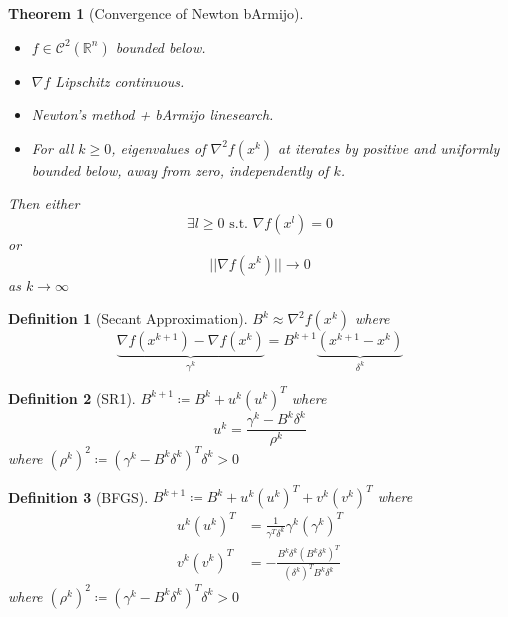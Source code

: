 \documentclass[a4paper]{article}
\newcommand{\R}{\mathbb{R}}
\newcommand{\C}{\mathcal{C}}
\newcommand{\st}{\text{ s.t. }}
\newcommand{\norm}[1]{\lvert \lvert #1 \rvert \rvert}
\newtheorem{theorem}{Theorem}
\newtheorem*{definition*}{Definition}
\begin{document}
\setcounter{theorem}{8}
\begin{theorem}[Convergence of Newton bArmijo]
    \begin{itemize}
        \item $f \in \C^2 \left( \R^n \right)$ bounded below.
        \item $\nabla f$ Lipschitz continuous.
        \item Newton's method + bArmijo linesearch.
        \item For all $k \geq 0$, eigenvalues of $\nabla^2 f\left( x^k \right)$ at iterates by positive and uniformly bounded below, away from zero, independently of $k$.
    \end{itemize}
    Then either
    \begin{equation*}
        \exists l \geq 0 \st \nabla f \left( x^l \right) = 0
    \end{equation*}
    or
    \begin{equation*}
        \norm{\nabla f \left( x^k \right)} \rightarrow 0
    \end{equation*}
    as $k \rightarrow \infty$
\end{theorem}

\begin{definition*}[Secant Approximation]
    $B^k \approx \nabla^2 f \left( x^k \right)$ where
    \begin{equation*}
        \underbrace{\nabla f \left( x^{k+1} \right) - \nabla f \left( x^k \right)}_{\gamma^k} = B^{k+1} \underbrace{\left( x^{k+1} - x^k \right)}_{\delta^k}
    \end{equation*}
\end{definition*}

\begin{definition*}[SR1]
    $B^{k+1} \coloneqq B^k + u^k \left( u^k \right)^T$ where
    \begin{equation*}
        u^k = \frac{\gamma^k - B^k \delta^k}{\rho^k}
    \end{equation*}
    where $\left( \rho^k \right)^2 \coloneqq \left( \gamma^k - B^k \delta^k \right)^T \delta^k > 0$
\end{definition*}

\begin{definition*}[BFGS]
    $B^{k+1} \coloneqq B^k + u^k \left( u^k \right)^T + v^k \left( v^k \right)^T$ where
    \begin{align*}
        u^k \left( u^k \right)^T &=  \frac{1}{\gamma^T \delta^k}\gamma^k \left( \gamma^k \right)^T \\
        v^k \left( v^k \right)^T &=  - \frac{B^k \delta^k \left( B^k \delta^k \right)^T}{\left( \delta^k \right)^T B^k \delta^k}
    \end{align*}
    where $\left( \rho^k \right)^2 \coloneqq \left( \gamma^k - B^k \delta^k \right)^T \delta^k > 0$
\end{definition*}
\end{document}
